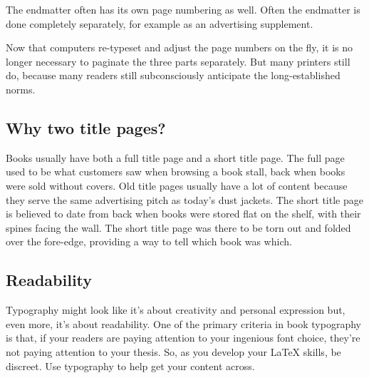 The endmatter often has its own page numbering as well. Often the endmatter is done completely separately, for example as an advertising supplement.

Now that computers re-typeset and adjust the page numbers on the fly, it is no longer necessary to paginate the three parts separately. But many printers still do, because many readers still subconsciously anticipate the long-established norms.

\subsection{Why two title pages?}
Books usually have both a full title page and a short title page. The full page used to be what customers saw when browsing a book stall, back when books were sold without covers. Old title pages usually have a lot of content because they serve the same advertising pitch as today's dust jackets. The short title page is believed to date from back when books were stored flat on the shelf, with their spines facing the wall. The short title page was there to be torn out and folded over the fore-edge, providing a way to tell which book was which.

\subsection{Readability}
Typography might look like it's about creativity and personal expression but, even more, it's about readability. One of the primary criteria in book typography is that, if your readers are paying attention to your ingenious font choice, they're not paying attention to your thesis. So, as you develop your LaTeX skills, be discreet. Use typography to help get your content across.
